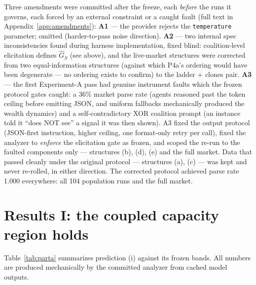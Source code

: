 \documentclass{article} %
\newcommand{\Ghat}{\hat{G}}
\begin{document}
Three amendments were committed after the freeze, each \emph{before} the runs it governs, each forced by an external constraint or a caught fault (full text in Appendix~\ref{app:amendments}): \textbf{A1} --- the provider rejects the \texttt{temperature} parameter; omitted (harder-to-pass noise direction). \textbf{A2} --- two internal spec inconsistencies found during harness implementation, fixed blind: coalition-level elicitation defines $\Ghat_S$ (see above), and the live-market structures were corrected from two equal-information structures (against which P4a's ordering would have been degenerate --- no ordering exists to confirm) to the ladder + clones pair. \textbf{A3} --- the first Experiment-A pass had genuine instrument faults which the frozen protocol gates caught: a 36\% market parse rate (agents reasoned past the token ceiling before emitting JSON, and uniform fallbacks mechanically produced the wealth dynamics) and a self-contradictory XOR coalition prompt (an instance told it ``does NOT see'' a signal it was then shown). A3 fixed the output protocol (JSON-first instruction, higher ceiling, one format-only retry per call), fixed the analyzer to \emph{enforce} the elicitation gate as frozen, and scoped the re-run to the faulted components only --- structures (b), (d), (e) and the full market. Data that passed cleanly under the original protocol --- structures (a), (c) --- was kept and never re-rolled, in either direction. The corrected protocol achieved parse rate 1.000 everywhere: all 104 population runs and the full market.

\section{Results I: the coupled capacity region holds}
\label{sec:results-i}

Table~\ref{tab:parta} summarizes prediction (i) against its frozen bands. All numbers are produced mechanically by the committed analyzer from cached model outputs.
\end{document}
